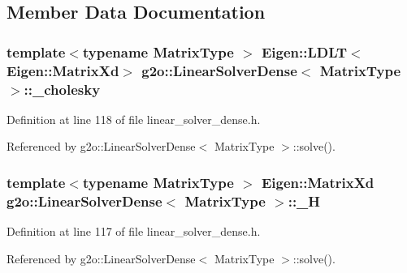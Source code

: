 \subsection{Member Data Documentation}
\subsubsection[{\texorpdfstring{\+\_\+cholesky}{_cholesky}}]{\setlength{\rightskip}{0pt plus 5cm}template$<$typename Matrix\+Type $>$ Eigen\+::\+L\+D\+LT$<$Eigen\+::\+Matrix\+Xd$>$ {\bf g2o\+::\+Linear\+Solver\+Dense}$<$ Matrix\+Type $>$\+::\+\_\+cholesky\hspace{0.3cm}{\ttfamily [protected]}}\hypertarget{classg2o_1_1LinearSolverDense_a20fc35e2f25107a6e36211861034aae0}{}\label{classg2o_1_1LinearSolverDense_a20fc35e2f25107a6e36211861034aae0}


Definition at line 118 of file linear\+\_\+solver\+\_\+dense.\+h.



Referenced by g2o\+::\+Linear\+Solver\+Dense$<$ Matrix\+Type $>$\+::solve().

\subsubsection[{\texorpdfstring{\+\_\+H}{_H}}]{\setlength{\rightskip}{0pt plus 5cm}template$<$typename Matrix\+Type $>$ Eigen\+::\+Matrix\+Xd {\bf g2o\+::\+Linear\+Solver\+Dense}$<$ Matrix\+Type $>$\+::\+\_\+H\hspace{0.3cm}{\ttfamily [protected]}}\hypertarget{classg2o_1_1LinearSolverDense_a5ca6a1f2358ce0620dbdbae3fdc9fc99}{}\label{classg2o_1_1LinearSolverDense_a5ca6a1f2358ce0620dbdbae3fdc9fc99}


Definition at line 117 of file linear\+\_\+solver\+\_\+dense.\+h.



Referenced by g2o\+::\+Linear\+Solver\+Dense$<$ Matrix\+Type $>$\+::solve().

